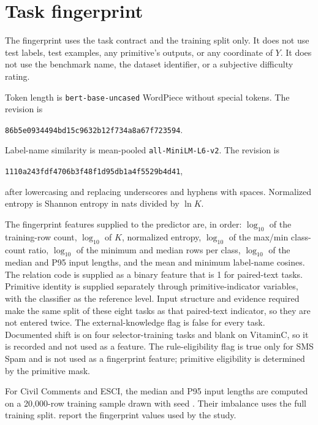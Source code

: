\section{Task fingerprint}
\label{sec:fingerprint}

The fingerprint uses the task contract and the training split only. It does not use test labels, test examples, any primitive's outputs, or any coordinate of \(Y\). It does not use the benchmark name, the dataset identifier, or a subjective difficulty rating.

Token length is \mbox{\texttt{bert-base-uncased}} WordPiece without special tokens. The revision is
\begin{center}
\texttt{86b5e0934494bd15c9632b12f734a8a67f723594}.
\end{center}
Label-name similarity is mean-pooled \mbox{\texttt{all-MiniLM-L6-v2}}. The revision is
\begin{center}
\texttt{1110a243fdf4706b3f48f1d95db1a4f5529b4d41},
\end{center}
after lowercasing and replacing underscores and hyphens with spaces. Normalized entropy is Shannon entropy in nats divided by \(\ln K\).

The fingerprint features supplied to the predictor are, in order: \(\log_{10}\) of the training-row count, \(\log_{10}\) of \(K\), normalized entropy, \(\log_{10}\) of the max/min class-count ratio, \(\log_{10}\) of the minimum and median rows per class, \(\log_{10}\) of the median and P95 input lengths, and the mean and minimum label-name cosines. The relation code is supplied as a binary feature that is 1 for paired-text tasks. Primitive identity is supplied separately through primitive-indicator variables, with the classifier as the reference level. Input structure and evidence required make the same split of these eight tasks as that paired-text indicator, so they are not entered twice. The external-knowledge flag is false for every task. Documented shift is  on four selector-training tasks and blank on VitaminC, so it is recorded and not used as a feature. The rule-eligibility flag is true only for SMS Spam and is not used as a fingerprint feature; primitive eligibility is determined by the primitive mask.

For Civil Comments and ESCI, the median and P95 input lengths are computed on a 20{,}000-row training sample drawn with seed . Their imbalance uses the full training split.  report the fingerprint values used by the study.

